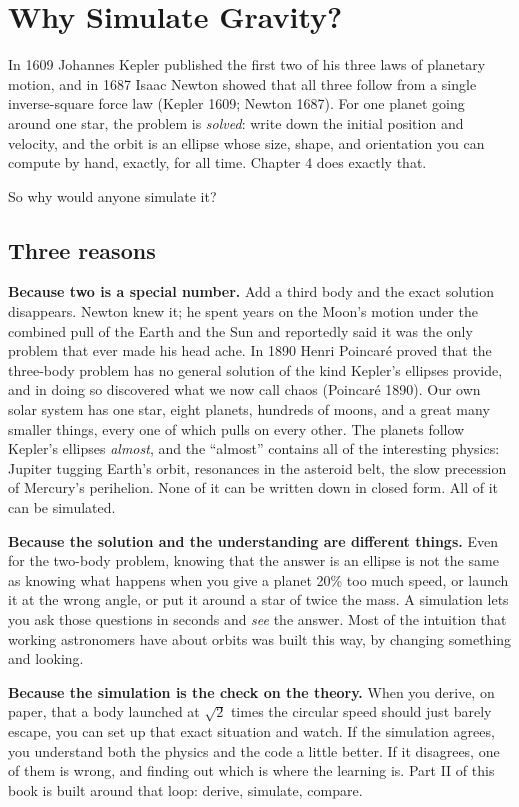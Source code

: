 \documentclass[
  10.5pt,
  letterpaper,
]{scrbook}
\theoremstyle{plain}
\theoremstyle{remark}
\begin{document}
\chapter{Why Simulate Gravity?}\label{sec-why-simulate}

In 1609 Johannes Kepler published the first two of his three laws of
planetary motion, and in 1687 Isaac Newton showed that all three follow
from a single inverse-square force law (Kepler 1609; Newton 1687). For
one planet going around one star, the problem is \emph{solved}: write
down the initial position and velocity, and the orbit is an ellipse
whose size, shape, and orientation you can compute by hand, exactly, for
all time. Chapter 4 does exactly that.

So why would anyone simulate it?

\section{Three reasons}\label{three-reasons}

\textbf{Because two is a special number.} Add a third body and the exact
solution disappears. Newton knew it; he spent years on the Moon's motion
under the combined pull of the Earth and the Sun and reportedly said it
was the only problem that ever made his head ache. In 1890 Henri
Poincaré proved that the three-body problem has no general solution of
the kind Kepler's ellipses provide, and in doing so discovered what we
now call chaos (Poincaré 1890). Our own solar system has one star, eight
planets, hundreds of moons, and a great many smaller things, every one
of which pulls on every other. The planets follow Kepler's ellipses
\emph{almost}, and the ``almost'' contains all of the interesting
physics: Jupiter tugging Earth's orbit, resonances in the asteroid belt,
the slow precession of Mercury's perihelion. None of it can be written
down in closed form. All of it can be simulated.

\textbf{Because the solution and the understanding are different
things.} Even for the two-body problem, knowing that the answer is an
ellipse is not the same as knowing what happens when you give a planet
20\% too much speed, or launch it at the wrong angle, or put it around a
star of twice the mass. A simulation lets you ask those questions in
seconds and \emph{see} the answer. Most of the intuition that working
astronomers have about orbits was built this way, by changing something
and looking.

\textbf{Because the simulation is the check on the theory.} When you
derive, on paper, that a body launched at \(\sqrt{2}\) times the
circular speed should just barely escape, you can set up that exact
situation and watch. If the simulation agrees, you understand both the
physics and the code a little better. If it disagrees, one of them is
wrong, and finding out which is where the learning is. Part II of this
book is built around that loop: derive, simulate, compare.
\end{document}
